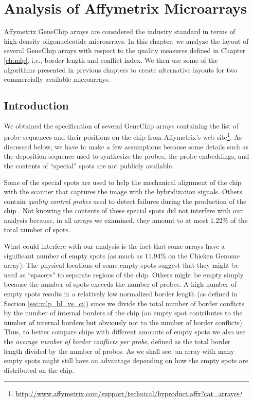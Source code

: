\chapter{Analysis of Affymetrix Microarrays}
\label{ch:affy}

Affymetrix GeneChip arrays are considered the industry standard in terms of
high-density oligonucleotide microarrays. In this chapter, we analyze the layout
of several GeneChip arrays with respect to the quality measures defined in
Chapter \ref{ch:mlp}, i.e., border length and conflict index. We then use some
of the algorithms presented in previous chapters to create alternative layouts
for two commercially available microarrays.

\section{Introduction}
\label{sec:affy_intro}

We obtained the specification of several GeneChip arrays containing the list of
probe sequences and their positions on the chip from Affymetrix's web
site\footnote{\url{http://www.affymetrix.com/support/technical/byproduct.affx?cat=arrays}}.
As discussed below, we have to make a few assumptions because some details such
as the deposition sequence used to synthesize the probes, the probe embeddings,
and the contents of ``special'' spots are not publicly available.

Some of the special spots are used to help the mechanical alignment of the chip
with the scanner that captures the image with the hybridization signals. Others
contain \emph{quality control probes} used to detect failures during the
production of the chip \citep{Affymetrix2002,Hubbell1999a}. Not knowing the
contents of these special spots did not interfere with our analysis because, in
all arrays we examined, they amount to at most $1.22\%$ of the total number of
spots.

What could interfere with our analysis is the fact that some arrays have a
significant number of empty spots (as much as $11.94\%$ on the Chicken Genome
array). The physical locations of some empty spots suggest that they might be
used as ``spacers'' to separate regions of the chip. Others might be empty
simply because the number of spots exceeds the number of probes. A high number
of empty spots results in a relatively low normalized border length (as defined
in Section \ref{sec:mlp_bl_vs_ci}) since we divide the total number of border
conflicts by the number of internal borders of the chip (an empty spot
contributes to the number of internal borders but obviously not to the number of
border conflicts). Thus, to better compare chips with different amounts of empty
spots we also use the \emph{average number of border conflicts per probe},
defined as the total border length divided by the number of probes. As we shall
see, an array with many empty spots might still have an advantage depending on
how the empty spots are distributed on the chip.

